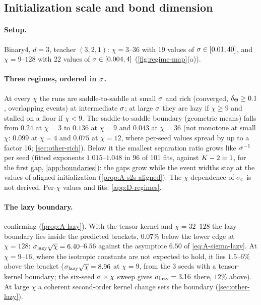 \subsection{Initialization scale and bond dimension}\label{sec:regime-sigma-chi}

\paragraph{Setup.}
Binary4, $d=3$, teacher $(3,2,1)$: $\chi=3$--$36$ with 19 values of $\sigma\in[0.01,40]$, and $\chi=9$--$128$ with 22
values of $\sigma\in[0.004,4]$ (\cref{fig:regime-map}(a)).

\paragraph{Three regimes, ordered in $\sigma$.}
\empirical{} At every $\chi$ the runs are saddle-to-saddle at small $\sigma$ and rich (converged, $\delta_{\Theta}\ge0.1$,
overlapping events) at intermediate $\sigma$; at large $\sigma$ they are lazy if $\chi\ge9$ and stalled on a floor if
$\chi<9$. The saddle-to-saddle boundary (geometric means) falls from $0.24$ at $\chi=3$ to $0.136$ at $\chi=9$
and $0.043$ at $\chi=36$ (not monotone at small $\chi$: $0.099$ at $\chi=4$ and $0.075$ at $\chi=12$, where per-seed values
spread by up to a factor 16; \cref{sec:other-rich}). Below it the smallest separation ratio grows like
$\sigma^{-1}$ per seed (fitted exponents $1.015$--$1.048$ in 96 of 101 fits, against $K-2=1$, \derived{} for the
first gap, \cref{app:boundaries}): the gaps grow while the event widths stay at the values of aligned
initialization (\cref{prop:A-s2s-aligned}). The $\chi$-dependence of $\sigma_c$ is not derived. Per-$\chi$ values
and fits: \cref{app:D-regimes}.

\paragraph{The lazy boundary.}
\empirical{} confirming \derived{} (\cref{prop:A-lazy}). With the tensor kernel and $\chi=32$--$128$ the lazy
boundary lies inside the predicted brackets, $0.07\%$ below the lower edge at $\chi=128$:
$\sigma_{\rm lazy}\sqrt\chi=6.40$--$6.56$ against the asymptote $6.50$ of \eqref{eq:A-sigma-lazy}. At $\chi=9$--$16$,
where the isotropic constants are not expected to hold, it lies $1.5$--$6\%$ above the bracket
($\sigma_{\rm lazy}\sqrt\chi=8.96$ at $\chi=9$, from the 3 seeds with a tensor-kernel boundary; the six-seed
$\sigma\times\chi$ sweep gives $\sigma_{\rm lazy}=3.16$ there, $12\%$ above). At large $\chi$ a coherent second-order kernel change sets the
boundary (\cref{sec:other-lazy}).  

